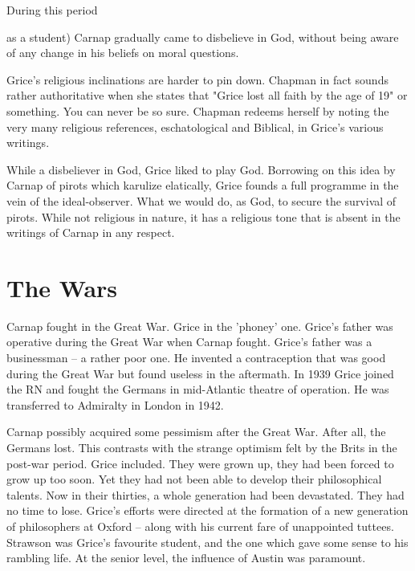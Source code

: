 \documentclass[10pt,titlepage]{book}
\begin{document}
During this period {as a student) Carnap gradually came to 
disbelieve in God, without being aware of any change in  his beliefs on moral questions. 

Grice's religious inclinations are harder to pin down. Chapman in  
fact sounds rather authoritative when she states that "Grice lost all faith by 
 the age of 19" or something. You can never be so sure. Chapman redeems 
herself  by noting the very many religious references, eschatological and 
Biblical, in  Grice's various writings.

While a disbeliever in God, Grice liked to play God. Borrowing on  
this idea by Carnap of pirots which karulize elatically, Grice founds a full  
programme in the vein of the ideal-observer. What we would do, as God, to 
secure  the survival of pirots. While not religious in nature, it has a 
religious tone  that is absent in the writings of Carnap in any respect.
 
\section{The Wars}

Carnap fought in the Great War. Grice in the 'phoney' one. Grice's father  
was operative during the Great War when Carnap fought. Grice's father was a  
businessman -- a rather poor one. He invented a contraception that was good 
 during the Great War but found useless in the aftermath. In 1939 Grice 
joined  the RN and fought the Germans in mid-Atlantic theatre of operation. He 
was  transferred to Admiralty in London in 1942. 
 
Carnap possibly acquired some pessimism after the Great War.
After all, the Germans lost. This contrasts with the strange optimism felt by the  
Brits in the post-war period. Grice included. They were grown up, they had 
been  forced to grow up too soon. Yet they had not been able to develop their  
philosophical talents. Now in their thirties, a whole generation had been  
devastated. They had no time to lose. Grice's efforts were directed at the  
formation of a new generation of philosophers at Oxford -- along with his  
current fare of unappointed tuttees. Strawson was Grice's favourite student, 
and  the one which gave some sense to his rambling life. At the senior level, 
the  influence of Austin was paramount.


}
\end{document}
